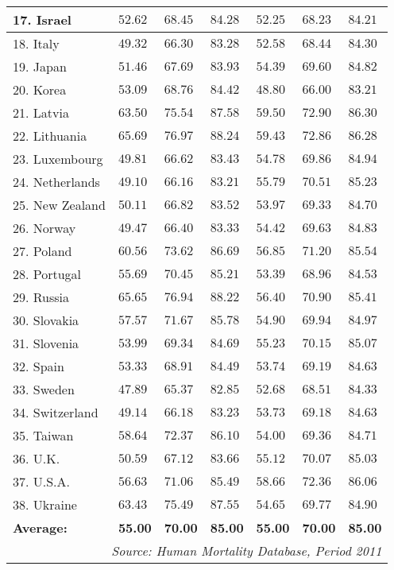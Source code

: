 \documentclass[12pt, titlepage]{article}%
\begin{document}
\begin{longtable}{||
    p{95pt}|
    p{35pt}|
    p{35pt}|
    p{35pt}|
    p{35pt}|
    p{35pt}|
    p{35pt}
||}
17. Israel & $52.62$ & $68.45$ & $84.28$ & $52.25$ & $68.23$ & $84.21$\\ \hline \hline
18. Italy & $49.32$ & $66.30$ & $83.28$ & $52.58$ & $68.44$ & $84.30$\\ \hline \hline
19. Japan & $51.46$ & $67.69$ & $83.93$ & $54.39$ & $69.60$ & $84.82$\\ \hline \hline
20. Korea & $53.09$ & $68.76$ & $84.42$ & $48.80$ & $66.00$ & $83.21$\\ \hline \hline
21. Latvia & $63.50$ & $75.54$ & $87.58$ & $59.50$ & $72.90$ & $86.30$\\ \hline \hline
22. Lithuania & $65.69$ & $76.97$ & $88.24$ & $59.43$ & $72.86$ & $86.28$\\ \hline \hline
23. Luxembourg & $49.81$ & $66.62$ & $83.43$ & $54.78$ & $69.86$ & $84.94$\\ \hline \hline
24. Netherlands & $49.10$ & $66.16$ & $83.21$ & $55.79$ & $70.51$ & $85.23$\\ \hline \hline
25. New Zealand & $50.11$ & $66.82$ & $83.52$ & $53.97$ & $69.33$ & $84.70$\\ \hline \hline
26. Norway & $49.47$ & $66.40$ & $83.33$ & $54.42$ & $69.63$ & $84.83$\\ \hline \hline
27. Poland & $60.56$ & $73.62$ & $86.69$ & $56.85$ & $71.20$ & $85.54$\\ \hline \hline
28. Portugal & $55.69$ & $70.45$ & $85.21$ & $53.39$ & $68.96$ & $84.53$\\ \hline \hline
29. Russia & $65.65$ & $76.94$ & $88.22$ & $56.40$ & $70.90$ & $85.41$\\ \hline \hline
30. Slovakia & $57.57$ & $71.67$ & $85.78$ & $54.90$ & $69.94$ & $84.97$\\ \hline \hline
31. Slovenia & $53.99$ & $69.34$ & $84.69$ & $55.23$ & $70.15$ & $85.07$\\ \hline \hline
32. Spain & $53.33$ & $68.91$ & $84.49$ & $53.74$ & $69.19$ & $84.63$\\ \hline \hline
33. Sweden & $47.89$ & $65.37$ & $82.85$ & $52.68$ & $68.51$ & $84.33$\\ \hline \hline
34. Switzerland & $49.14$ & $66.18$ & $83.23$ & $53.73$ & $69.18$ & $84.63$\\ \hline \hline
35. Taiwan & $58.64$ & $72.37$ & $86.10$ & $54.00$ & $69.36$ & $84.71$\\ \hline \hline
36. U.K. & $50.59$ & $67.12$ & $83.66$ & $55.12$ & $70.07$ & $85.03$\\ \hline \hline
37. U.S.A. & $56.63$ & $71.06$ & $85.49$ & $58.66$ & $72.36$ & $86.06$\\ \hline \hline
38. Ukraine & $63.43$ & $75.49$ & $87.55$ & $54.65$ & $69.77$ & $84.90$\\ \hline \hline
{\bf Average:} & {\bf55.00} & {\bf70.00} & {\bf85.00} & {\bf55.00} & {\bf70.00} & {\bf85.00}\\ \hline \hline
\hline
\multicolumn{7}{||r||}{{\em Source: Human Mortality Database, Period 2011}} \\ \hline\hline
\end{longtable}
\end{document}
